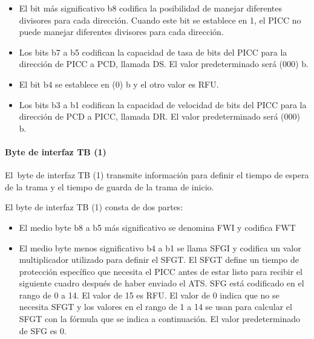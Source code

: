 \begin{itemize}
	\item El bit más significativo b8 codifica la posibilidad de manejar diferentes divisores para cada dirección. Cuando este bit se establece en 1, el PICC no puede manejar diferentes divisores para cada dirección.\par

	\item Los bits b7 a b5 codifican la capacidad de tasa de bits del PICC para la dirección de PICC a PCD, llamada DS. El valor predeterminado será (000) b.\par

	\item El bit b4 se establece en (0) b y el otro valor es RFU.\par

	\item Los bits b3 a b1 codifican la capacidad de velocidad de bits del PICC para la dirección de PCD a PICC, llamada DR. El valor predeterminado será (000) b.
\end{itemize}\par

\paragraph{Byte de interfaz TB (1)}
El\ byte de interfaz TB (1) transmite información para definir el tiempo de espera de la trama y el tiempo de guarda  de la trama de inicio.\par

El byte de interfaz TB (1) consta de dos partes:\par

\begin{itemize}
	\item El medio byte b8 a b5 más significativo se denomina FWI y codifica FWT\par

	\item El medio byte menos significativo b4 a b1 se llama SFGI y codifica un valor multiplicador utilizado para definir el SFGT. El SFGT define un tiempo de protección específico que necesita el PICC antes de estar listo para recibir el siguiente cuadro después de haber enviado el ATS. SFG está codificado en el rango de 0 a 14. El valor de 15 es RFU. El valor de 0 indica que no se necesita SFGT y los valores en el rango de 1 a 14 se usan para calcular el SFGT con la fórmula que se indica a continuación. El valor predeterminado de SFG es 0.
\end{itemize}\par

